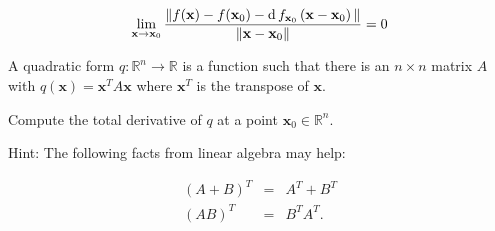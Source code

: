 \documentclass{article}
\begin{document}
    \begin{equation}
        \lim_{\mathbf{x}\rightarrow\mathbf{x}_{0}}
        \frac{%
            \|f(\mathbf{x})-f(\mathbf{x}_{0})-
                \operatorname{d}f_{\mathbf{x}_{0}}
                \left(\mathbf{x}-\mathbf{x}_{0}\right)
            \|%
        }{%
            \|\mathbf{x}-\mathbf{x}_{0}\|%
        }=0
    \end{equation}

    A quadratic form $q:\mathbb{R}^{n}\rightarrow\mathbb{R}$
    is a function such that there is an $n\times{n}$ matrix $A$
    with $q(\mathbf{x})=\mathbf{x}^{T}A\mathbf{x}$ where
    $\mathbf{x}^{T}$ is the transpose of $\mathbf{x}$.
    \par\hfill\par
    Compute the total derivative of $q$
    at a point $\mathbf{x}_{0}\in\mathbb{R}^{n}$.
    \par\hfill\par
    Hint: The following facts from linear algebra may help:

    \begin{equation}
        \begin{array}{rcl}
            \displaystyle
            (A+B)^{T}
            &=&
            \displaystyle
            A^{T}+B^{T}\\[1.5em]
            (AB)^{T}
            &=&
            B^{T}A^{T}.
        \end{array}
    \end{equation}
\end{document}
